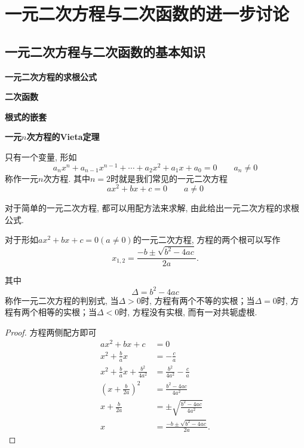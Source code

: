 \section{一元二次方程与二次函数的进一步讨论}
\subsection{一元二次方程与二次函数的基本知识}
\begin{know}
    \item\textbf{一元二次方程的求根公式}
    
    \item \textbf{二次函数}
    \item \textbf{根式的嵌套}
    \item \textbf{一元\(n\)次方程的Vieta定理}
\end{know}
\begin{definition}[一元\(n\)次方程]\label{def:一元n次方程}
    只有一个变量, 形如
    \begin{equation}
        a_nx^n+a_{n-1}x^{n-1}+\cdots+a_2x^2+a_1x+a_0=0\qquad a_n\neq 0
    \end{equation}
    称作一元\(n\)次方程. 其中\(n=2\)时就是我们常见的一元二次方程
    \begin{equation}
        ax^2+bx+c=0\qquad a\neq 0
    \end{equation}
\end{definition}

对于简单的一元二次方程, 都可以用配方法来求解, 
由此给出一元二次方程的求根公式. 
\begin{theorem}[一元二次方程的求根公式]
    对于形如\(ax^2+bx+c=0(a\neq0)\)的一元二次方程, 方程的两个根可以写作
    \begin{equation}
        x_{1,2}=\frac{-b\pm \sqrt{b^2-4ac}}{2a}.
    \end{equation}

    其中\begin{equation}
        \Delta=b^2-4ac
    \end{equation}
    称作一元二次方程的判别式, 当\(\Delta>0\)时, 方程有两个不等的实根；当\(\Delta=0\)时, 
    方程有两个相等的实根；当\(\Delta<0\)时, 方程没有实根, 而有一对共轭虚根. 
\end{theorem}
\begin{proof}
    方程两侧配方即可
    \begin{align*}
       ax^2+bx+c&=0\\
       x^2+\frac{b}{a}x&=-\frac{c}{a}\\
       x^2+\frac{b}{a}x+\frac{b^2}{4a^2}&=\frac{b^2}{4a^2}-\frac{c}{a}\\
       (x+\frac{b}{2a})^2&=\frac{b^2-4ac}{4a^2}\\
       x+\frac{b}{2a}&=\pm \sqrt{\frac{b^2-4ac}{4a^2}}\\
       x&=\frac{-b\pm \sqrt{b^2-4ac}}{2a}.
    \end{align*}

    
\end{proof}

